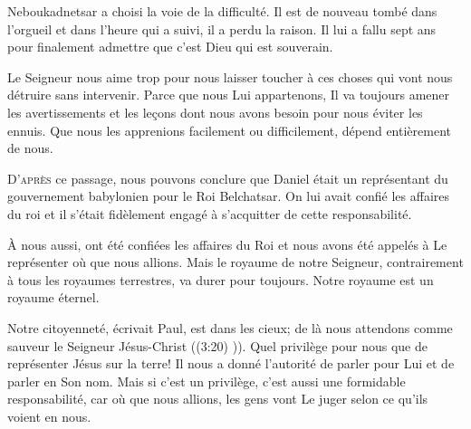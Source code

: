 Neboukadnetsar a choisi la voie de la difficulté.
 Il est de nouveau tombé dans l'orgueil et dans l'heure qui a suivi,
 il a perdu la raison. Il lui a fallu sept ans pour finalement admettre
 que c'est  Dieu qui est souverain. 

Le Seigneur nous aime trop pour nous laisser toucher à ces choses
 qui vont nous détruire sans intervenir. Parce que nous Lui appartenons,
 Il va toujours amener les avertissements et les le\c{c}ons
 dont nous avons besoin pour nous éviter les ennuis.
 Que nous les apprenions facilement ou difficilement,
 dépend entièrement de nous. 

\dvrule






\lettrine{D}{'après} ce passage,
 nous pouvons conclure que Daniel était un représentant du gouvernement
 babylonien pour le Roi Belchatsar. On lui avait confié
 les affaires du roi et il s'était fidèlement engagé
 à s'acquitter de cette responsabilité. 

À nous aussi, ont été confiées les affaires du Roi et nous avons été appelés
 à Le représenter où que nous allions. Mais le royaume de notre Seigneur,
 contrairement à tous les royaumes terrestres, 
 va durer pour toujours.  Notre royaume est un royaume éternel. 


\Og Notre citoyenneté, écrivait Paul, 
 est dans les cieux; de là nous attendons comme sauveur
 le Seigneur Jésus-Christ \Fg{} ((3:20) \NBS)).
 Quel privilège pour nous que de représenter Jésus sur la terre!
 Il nous a donné l'autorité de parler pour Lui et de parler en Son nom.
 Mais si c'est un privilège, c'est aussi une formidable responsabilité,
 car où que nous allions, les gens vont Le juger selon ce qu'ils voient en nous. 

